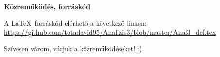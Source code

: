 \documentclass[a4paper]{article}
\theoremstyle{qstyle}
\begin{document}
	\vspace{2em}
	\begin{center}
		{\LARGE\textbf{Közreműködés, forráskód}}
	\end{center}

	A \LaTeX\ forráskód elérhető a következő linken:\\ \url{https://github.com/totadavid95/Analizis3/blob/master/Anal3_def.tex} 
	
	Szívesen várom, várjuk a közreműködéseket! :)
\end{document}
